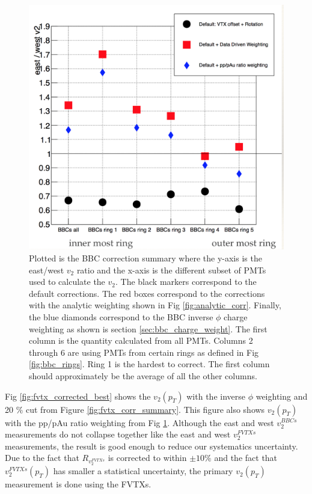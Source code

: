 \begin{figure}[!h]
\begin{center}
\includegraphics[width=0.5\linewidth]{figs/bbc_correction_summary.png}
\caption{Plotted is the BBC correction summary where the y-axis is the east/west $v_2$ ratio and the x-axis is the different subset of PMTs used to calculate the $v_2$. The black markers correspond to the default corrections. The red boxes correspond to the corrections with the analytic weighting shown in Fig \ref{fig:analytic_corr}. Finally, the blue diamonds correspond to the BBC inverse $\phi$ charge weighting as shown is section \ref{sec:bbc_charge_weight}. The first column is the quantity calculated from all PMTs. Columns 2 through 6 are using PMTs from certain rings as defined in Fig \ref{fig:bbc_rings}. Ring 1 is the hardest to correct. The first column should approximately be the average of all the other columns.}
\label{fig:bbc_corr_summary}
\end{center}
\end{figure}

Fig \ref{fig:fvtx_corrected_best} shows the $v_2(p_T)$ with the inverse $\phi$ weighting and 20 $\%$ cut from Figure \ref{fig:fvtx_corr_summary}. This figure also shows $v_2(p_T)$ with the pp/pAu ratio weighting from Fig \ref{fig:bbc_corr_summary}. Although the east and west $v_2^{BBCs}$ measurements do not collapse together like the east and west $v_2^{FVTXs}$ measurements, the result is good enough to reduce our systematics uncertainty. Due to the fact that $R_{v_2^{FVTXs}}$ is corrected to within $\pm10\%$ and the fact that $v_2^{FVTXs}(p_T)$ has smaller a statistical uncertainty, the primary $v_2(p_T)$ measurement is done using the FVTXs.


